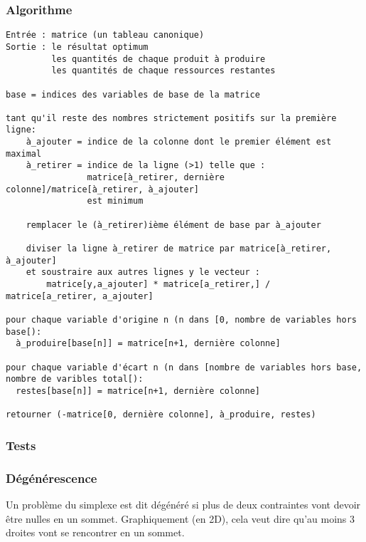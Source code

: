 \documentclass{scrartcl}
\begin{document}
    \subsubsection{Algorithme}
      \begin{lstlisting}
Entrée : matrice (un tableau canonique)
Sortie : le résultat optimum
         les quantités de chaque produit à produire
         les quantités de chaque ressources restantes

base = indices des variables de base de la matrice

tant qu'il reste des nombres strictement positifs sur la première ligne:
    à_ajouter = indice de la colonne dont le premier élément est maximal
    à_retirer = indice de la ligne (>1) telle que :
                matrice[à_retirer, dernière colonne]/matrice[à_retirer, à_ajouter]
                est minimum

    remplacer le (à_retirer)ième élément de base par à_ajouter

    diviser la ligne à_retirer de matrice par matrice[à_retirer, à_ajouter]
    et soustraire aux autres lignes y le vecteur :
        matrice[y,a_ajouter] * matrice[a_retirer,] / matrice[a_retirer, a_ajouter]

pour chaque variable d'origine n (n dans [0, nombre de variables hors base[):
  à_produire[base[n]] = matrice[n+1, dernière colonne]

pour chaque variable d'écart n (n dans [nombre de variables hors base, nombre de varibles total[):
  restes[base[n]] = matrice[n+1, dernière colonne]

retourner (-matrice[0, dernière colonne], à_produire, restes)
      \end{lstlisting}

    \subsubsection{Tests}
      
    \subsubsection{Dégénérescence}
      Un problème du simplexe est dit dégénéré si plus de deux contraintes vont
      devoir être nulles en un sommet. Graphiquement (en 2D), cela veut dire
      qu'au moins 3 droites vont se rencontrer en un sommet.
\end{document}
